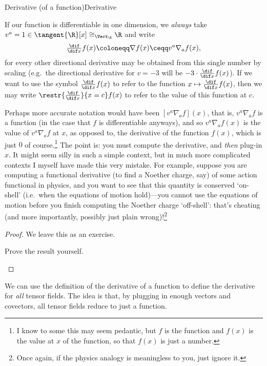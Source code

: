 \begin{prp}{Derivative (of a function)}{Derivative}
\begin{rmk}
\end{rmk}
\begin{rmk}
If our function is differentiable in one dimension, we \emph{always} take $v^a=1\in \tangent{\R}[x]\cong _{\Vect _{\R}}\R$ and write
\begin{equation}
\tfrac{\dif}{\dif x}f(x)\coloneqq \nabla f(x)\ceqq v^a\nabla _af(x),
\end{equation}
for every other directional derivative may be obtained from this single number by scaling (e.g.~the directional derivative for $v=-3$ will be $-3\cdot \frac{\dif}{\dif x}f(x)$).  If we want to use the symbol $\frac{\dif}{\dif x}f(x)$ to refer to the function $x\mapsto \frac{\dif}{\dif x}f(x)$, then we may write $\restr{\frac{\dif}{\dif x}}{x=c}f(x)$ to refer to the value of this function at $c$.
\end{rmk}
\begin{rmk}
Perhaps more accurate notation would have been $[v^a\nabla _af](x)$, that is, $v^a\nabla _af$ is a function (in the case that $f$ is differentiable anyways), and so $v^a\nabla _af(x)$ is the value of $v^a\nabla _af$ at $x$, as opposed to, the derivative of the function $f(x)$, which is just $0$ of course.\footnote{I know to some this may seem pedantic, but $f$ is the function and $f(x)$ is the value at $x$ of the function, so that $f(x)$ is just a number.}  The point is:  you must compute the derivative, and \emph{then} plug-in $x$.  It might seem silly in such a simple context, but in much more complicated contexts I myself have made this very mistake.  For example, suppose you are computing a functional derivative (to find a Noether charge, say) of some action functional in physics, and you want to see that this quantity is conserved `on-shell' (i.e.~when the equations of motion hold)---you cannot use the equations of motion before you finish computing the Noether charge `off-shell':  that's cheating (and more importantly, possibly just plain wrong)!\footnote{Once again, if the physics analogy is meaningless to you, just ignore it.}
\end{rmk}
\begin{proof}
We leave this as an exercise.
\begin{exr}[breakable=false]{}{}
Prove the result yourself.
\end{exr}
\end{proof}
\end{prp}
We can use the definition of the derivative of a function to define the derivative for \emph{all} tensor fields.  The idea is that, by plugging in enough vectors and covectors, all tensor fields reduce to just a function.
